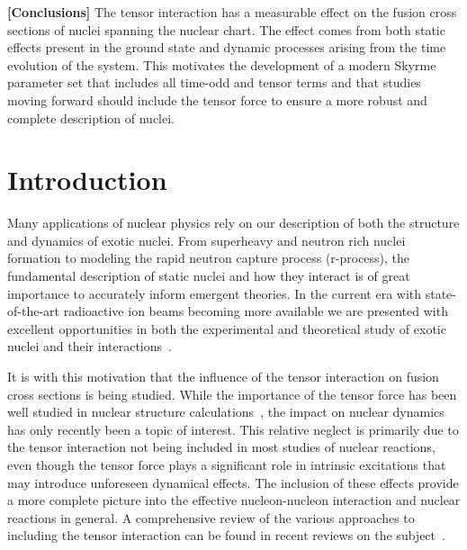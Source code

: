 		{\bf [Conclusions]}
		The tensor interaction has a measurable effect on the fusion cross sections of nuclei spanning the nuclear chart.
		The effect comes from both static effects present in the ground state and dynamic processes arising from the time evolution of the system.
		This motivates the development of a modern Skyrme parameter set that includes all time-odd and tensor terms and that studies moving forward should include the tensor force to ensure a more robust and complete description of nuclei.





\section{Introduction}
\label{ch5:introduction}
Many applications of nuclear physics rely on our description of both the structure and dynamics of exotic nuclei.
From superheavy and neutron rich nuclei formation to modeling the rapid neutron capture process (r-process), the fundamental description of static nuclei and how they interact is of great importance to accurately inform emergent theories.
In the current era with state-of-the-art radioactive ion beams becoming more available we are presented with excellent opportunities in both the experimental and theoretical study of exotic nuclei and their interactions~\citep{balantekin2014}.

It is with this motivation that the influence of the tensor interaction on fusion cross sections is being studied.
While the importance of the tensor force has been well studied in nuclear structure calculations~\citep{otsuka2005,otsuka2006,lesinski2007,colo2007,bai2010,otsuka2010,brink2018}, the impact on nuclear dynamics has only recently been a topic of interest.
This relative neglect is primarily due to the tensor interaction not being included in most studies of nuclear reactions, even though the tensor force plays a significant role in intrinsic excitations that may introduce unforeseen dynamical effects.
The inclusion of these effects provide a more complete picture into the effective nucleon-nucleon interaction and nuclear reactions in general.
A comprehensive review of the various approaches to including the tensor interaction can be found in recent reviews on the subject~\citep{sagawa2014,stevenson2019}.

